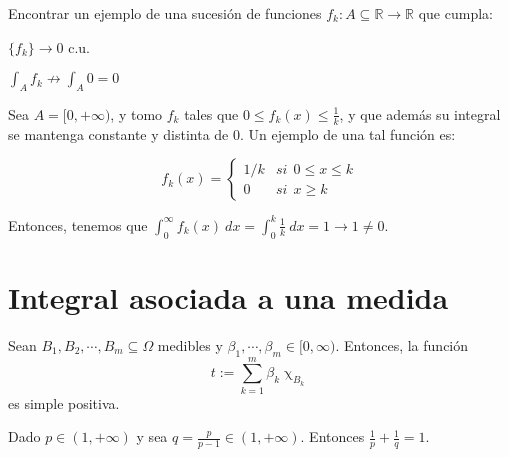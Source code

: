 \begin{ejer}
  Encontrar un ejemplo de una sucesión de funciones $f_k: A \subseteq \mathbb{R} \to \mathbb{R}$ que cumpla:
  \begin{nlist}
  \item $\{f_k\} \to 0$ c.u.
  \item $\displaystyle \int_A f_k \not \to \int_A 0 = 0$
  \end{nlist}
\end{ejer}

\begin{sol}
    Sea $A = [0,+\infty)$, y tomo $f_k$ tales que $0 \le f_k(x) \le \frac{1}{k}$, y que además su integral se mantenga constante y distinta de 0. Un ejemplo de una tal función es:

    $$f_k(x) =
    \begin{cases}
      1/k & si \ \ 0 \le x \le k \\
      0 & si \ \ x \ge k
    \end{cases}$$

    Entonces, tenemos que $\displaystyle \int_0^\infty f_k(x)\ dx = \int_0^k \frac{1}{k}\ dx = 1 \to 1 \ne 0 $.
  \end{sol}

\newpage



\section{Integral asociada a una medida}

\begin{ejer} Sean $B_1,B_2,\cdots,B_m \subseteq \Omega$ medibles y $\beta_1,\cdots,\beta_m\in[0,\infty)$. Entonces, la función $$t:= \sum_{k=1}^m \beta_k \upchi_{B_k}$$  es simple positiva.

\end{ejer}


\begin{ejer}
  Dado $p \in (1, +\infty)$ y sea $q = \frac{p}{p-1} \in (1, +\infty)$. Entonces $\frac{1}{p} + \frac{1}{q} = 1$.
\end{ejer}

